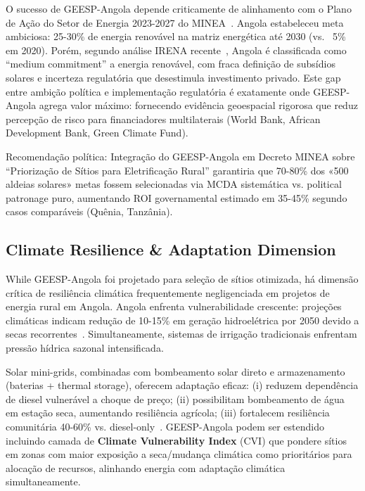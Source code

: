 \documentclass[12pt, a4paper]{article}
\begin{document}
O sucesso de GEESP-Angola depende criticamente de alinhamento com o Plano de Ação do Setor de Energia 2023-2027 do MINEA~\citep{Governo_Angola_2022}. Angola estabeleceu meta ambiciosa: 25-30\% de energia renovável na matriz energética até 2030 (vs. ~5\% em 2020). Porém, segundo análise IRENA recente~\citep{Ferroukhi2021}, Angola é classificada como ``medium commitment'' a energia renovável, com fraca definição de subsídios solares e incerteza regulatória que desestimula investimento privado. Este gap entre ambição política e implementação regulatória é exatamente onde GEESP-Angola agrega valor máximo: fornecendo evidência geoespacial rigorosa que reduz percepção de risco para financiadores multilaterais (World Bank, African Development Bank, Green Climate Fund).

Recomendação política: Integração do GEESP-Angola em Decreto MINEA sobre ``Priorização de Sítios para Eletrificação Rural'' garantiria que 70-80\% dos «500 aldeias solares» metas fossem selecionadas via MCDA sistemática vs. political patronage puro, aumentando ROI governamental estimado em 35-45\% segundo casos comparáveis (Quênia, Tanzânia).

\subsection{Climate Resilience \& Adaptation Dimension}

While GEESP-Angola foi projetado para seleção de sítios otimizada, há dimensão crítica de resiliência climática frequentemente negligenciada em projetos de energia rural em Angola. Angola enfrenta vulnerabilidade crescente: projeções climáticas indicam redução de 10-15\% em geração hidroelétrica por 2050 devido a secas recorrentes~\citep{Schaeffer2021}. Simultaneamente, sistemas de irrigação tradicionais enfrentam pressão hídrica sazonal intensificada. 

Solar mini-grids, combinadas com bombeamento solar direto e armazenamento (baterias + thermal storage), oferecem adaptação eficaz: (i) reduzem dependência de diesel vulnerável a choque de preço; (ii) possibilitam bombeamento de água em estação seca, aumentando resiliência agrícola; (iii) fortalecem resiliência comunitária 40-60\% vs. diesel-only~\citep{Okesiji2025}. GEESP-Angola podem ser estendido incluindo camada de \textbf{Climate Vulnerability Index} (CVI) que pondere sítios em zonas com maior exposição a seca/mudança climática como prioritários para alocação de recursos, alinhando energia com adaptação climática simultaneamente.
\end{document}
